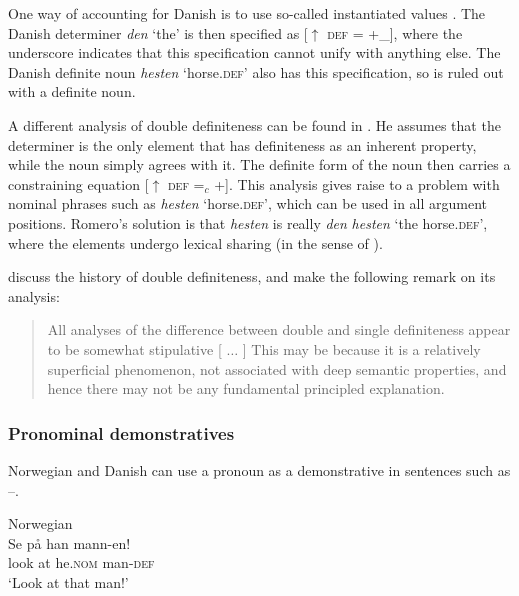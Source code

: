 \documentclass[output=paper,hidelinks]{langscibook}
\begin{document}
\noindent One way of accounting for Danish is to use so-called instantiated values \citep[213--14]{Strahan08}. The Danish determiner \textit{den} `the' is then specified as [${\uparrow}$ \textsc{def} = +\_], where the underscore indicates that this specification cannot unify with anything else. The Danish definite noun \textit{hesten} `horse.\textsc{def'} also has this specification, so  is ruled out with a definite noun.

 A different analysis of double definiteness can be found in \citet{Romero15}. He assumes that the determiner is the only element that has definiteness as an inherent property, while the noun simply agrees with it. The definite form of the noun then carries a constraining equation [${\uparrow}$ \textsc{def} =$_{c}$ +]. This analysis gives raise to a problem with nominal phrases such as \textit{hesten} `horse.\textsc{def',} which can be used in all argument positions. Romero's solution is that \textit{hesten} is really \textit{den} \textit{hesten} `the horse.\textsc{def',} where the elements undergo lexical sharing (in the sense of \citealt{wescoat2002}).

 \citet{BorjarsHarries08} discuss the history of double definiteness, and make the following remark on its analysis:

 \begin{quotation}
   All analyses of the difference between double and single definiteness appear to be somewhat stipulative [ $\ldots$ ] This may be because it is a relatively superficial phenomenon, not associated with deep semantic properties, and hence there may not be any fundamental principled explanation. \citep[341]{BorjarsHarries08}
   \end{quotation}

\subsubsection{Pronominal demonstratives}

Norwegian and Danish can use a pronoun as a demonstrative in sentences such as --.



\ea\label{ex:Scandinavian:99} Norwegian \citep[193]{Strahan08}\\
\gll
 {Se} {på} {han} {mann-en!}\\
 look at he.\textsc{nom} man-\textsc{def}\\
\glt `Look at that man!'\z
\end{document}
